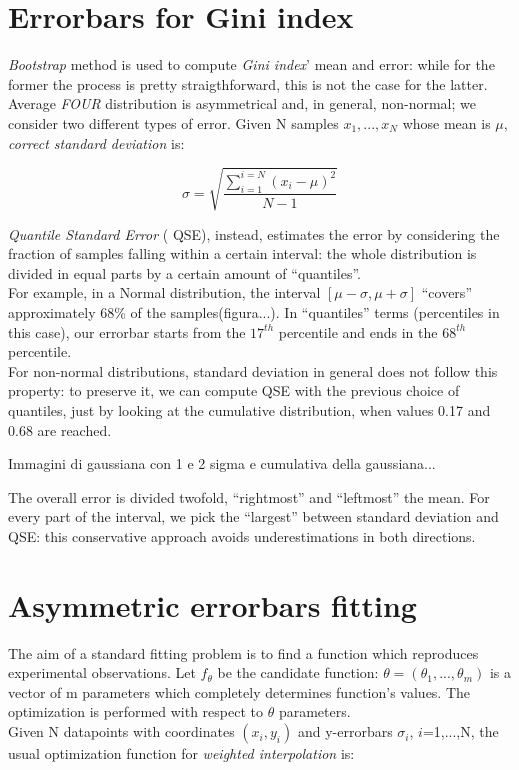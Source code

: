 \appendix
\section{Errorbars for Gini index}

\textit{Bootstrap} method is used to compute \textit{Gini index}' mean and error: while for the former the process is pretty straigthforward, this is not the case for the latter.
Average \textit{FOUR} distribution is asymmetrical and, in general, non-normal; we consider two different types of error.
Given N samples ${x_1,...,x_N}$ whose mean is $\mu$, \textit{correct standard deviation} is:

$$
\sigma=\sqrt{\frac{\sum_{i=1}^{i=N}(x_i - \mu)^2}{N-1}}
$$


\textit{Quantile Standard Error} (	QSE), instead, estimates the error by considering the fraction of samples falling within a certain interval: the whole distribution is divided in equal parts by a certain amount of ``quantiles''.\\
For example, in a Normal distribution, the interval $[\mu -\sigma, \mu +\sigma]$ ``covers'' approximately 68\% of the samples(figura...).
In ``quantiles'' terms (percentiles in this case), our errorbar starts from the $17^{th}$ percentile and ends in the $68^{th}$ percentile.\\
For non-normal distributions, standard deviation in general does not follow this property: to preserve it, we can compute QSE with the previous choice of quantiles, just by looking at the cumulative distribution, when values 0.17 and 0.68 are reached.

Immagini di gaussiana con 1 e 2 sigma e cumulativa della gaussiana...

The overall error is divided twofold, ``rightmost'' and ``leftmost''  the mean. For every part of the interval, we pick the ``largest'' between standard deviation and QSE: this conservative approach avoids underestimations in both directions.




\section{Asymmetric errorbars fitting}
The aim of a standard fitting problem is to find a function which reproduces experimental observations.
Let $f_{\theta}$ be the candidate function: $\theta=(\theta_1,...,\theta_m)$ is a vector of m parameters which completely determines function's values.
The optimization is performed with respect to $\theta$ parameters.\\
Given N datapoints with coordinates ${(x_i,y_i)}$ and y-errorbars $\sigma_i$, $i$=1,...,N, the usual optimization function for \textit{weighted interpolation} is:

